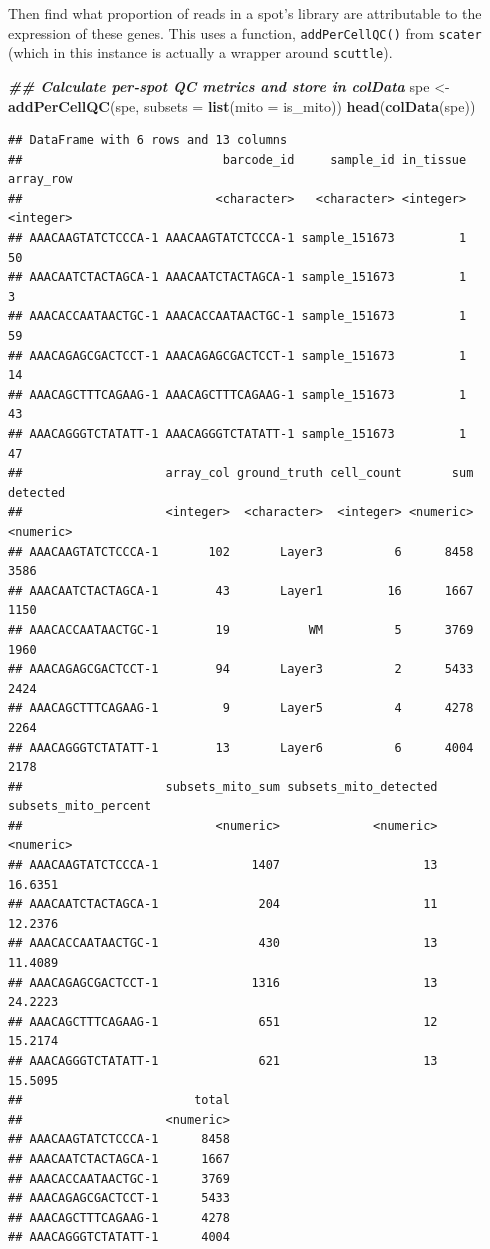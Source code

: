 \documentclass[
]{book}
\newenvironment{Shaded}{\begin{snugshade}}{\end{snugshade}}
\newcommand{\AttributeTok}[1]{\textcolor[rgb]{0.13,0.29,0.53}{#1}}
\newcommand{\DocumentationTok}[1]{\textcolor[rgb]{0.56,0.35,0.01}{\textbf{\textit{#1}}}}
\newcommand{\FunctionTok}[1]{\textcolor[rgb]{0.13,0.29,0.53}{\textbf{#1}}}
\newcommand{\NormalTok}[1]{#1}
\newcommand{\OtherTok}[1]{\textcolor[rgb]{0.56,0.35,0.01}{#1}}
\begin{document}
Then find what proportion of reads in a spot's library are attributable to the expression of these genes. This uses a function, \texttt{addPerCellQC()} from \texttt{scater} (which in this instance is actually a wrapper around \texttt{scuttle}).

\begin{Shaded}
\begin{Highlighting}[]
\DocumentationTok{\#\# Calculate per{-}spot QC metrics and store in colData}
\NormalTok{spe }\OtherTok{\textless{}{-}} \FunctionTok{addPerCellQC}\NormalTok{(spe, }\AttributeTok{subsets =} \FunctionTok{list}\NormalTok{(}\AttributeTok{mito =}\NormalTok{ is\_mito))}
\FunctionTok{head}\NormalTok{(}\FunctionTok{colData}\NormalTok{(spe))}
\end{Highlighting}
\end{Shaded}

\begin{verbatim}
## DataFrame with 6 rows and 13 columns
##                            barcode_id     sample_id in_tissue array_row
##                           <character>   <character> <integer> <integer>
## AAACAAGTATCTCCCA-1 AAACAAGTATCTCCCA-1 sample_151673         1        50
## AAACAATCTACTAGCA-1 AAACAATCTACTAGCA-1 sample_151673         1         3
## AAACACCAATAACTGC-1 AAACACCAATAACTGC-1 sample_151673         1        59
## AAACAGAGCGACTCCT-1 AAACAGAGCGACTCCT-1 sample_151673         1        14
## AAACAGCTTTCAGAAG-1 AAACAGCTTTCAGAAG-1 sample_151673         1        43
## AAACAGGGTCTATATT-1 AAACAGGGTCTATATT-1 sample_151673         1        47
##                    array_col ground_truth cell_count       sum  detected
##                    <integer>  <character>  <integer> <numeric> <numeric>
## AAACAAGTATCTCCCA-1       102       Layer3          6      8458      3586
## AAACAATCTACTAGCA-1        43       Layer1         16      1667      1150
## AAACACCAATAACTGC-1        19           WM          5      3769      1960
## AAACAGAGCGACTCCT-1        94       Layer3          2      5433      2424
## AAACAGCTTTCAGAAG-1         9       Layer5          4      4278      2264
## AAACAGGGTCTATATT-1        13       Layer6          6      4004      2178
##                    subsets_mito_sum subsets_mito_detected subsets_mito_percent
##                           <numeric>             <numeric>            <numeric>
## AAACAAGTATCTCCCA-1             1407                    13              16.6351
## AAACAATCTACTAGCA-1              204                    11              12.2376
## AAACACCAATAACTGC-1              430                    13              11.4089
## AAACAGAGCGACTCCT-1             1316                    13              24.2223
## AAACAGCTTTCAGAAG-1              651                    12              15.2174
## AAACAGGGTCTATATT-1              621                    13              15.5095
##                        total
##                    <numeric>
## AAACAAGTATCTCCCA-1      8458
## AAACAATCTACTAGCA-1      1667
## AAACACCAATAACTGC-1      3769
## AAACAGAGCGACTCCT-1      5433
## AAACAGCTTTCAGAAG-1      4278
## AAACAGGGTCTATATT-1      4004
\end{verbatim}
\end{document}
